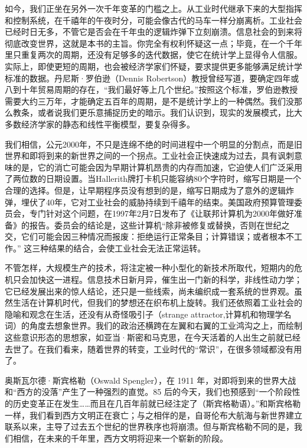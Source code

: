 如今，我们正坐在另外一次千年变革的门槛之上。从工业时代继承下来的大型指挥和控制系统，在千禧年的午夜时分，可能会像古代的马车一样分崩离析。工业社会已经时日无多，不管它是否会在千年虫的逻辑炸弹下立刻崩溃。信息社会的到来将彻底改变世界，这就是本书的主旨。你完全有权利怀疑这一点；毕竟，在一个千年里只重复两次的周期，还没有足够多的迭代数据，使它在统计学上显得令人信服。实际上，即使更短的周期，也会被经济学家们怀疑，要求提供更多能够满足统计学标准的数据。丹尼斯·罗伯逊（Dennis Robertson）教授曾经写道，要确定四年或八到十年贸易周期的存在，“我们最好等上几个世纪。”按照这个标准，罗伯逊教授需要大约三万年，才能确定五百年的周期，是不是统计学上的一种偶然。我们没那么教条，或者说我们更乐意捕捉历史的暗示。我们认识到，现实的发展模式，比大多数经济学家的静态和线性平衡模型，要复杂得多。


我们相信，公元2000年，不只是连绵不绝的时间进程中一个明显的分割点，而是旧世界和即将到来的新世界之间的一个拐点。工业社会正快速成为过去，具有讽刺意味的是，它的消亡可能会因为早期计算机昂贵的内存而加速，它迫使人们广泛采用了两位数的日期设置。当Hallerith牌打卡机只能容纳80个字符时，缩写日期是一个合理的选择。但是，让早期程序员没有想到的是，缩写日期成为了意外的逻辑炸弹，埋伏了40年，它对工业社会的威胁持续到千禧年的结束。美国政府预算管理委员会，专门针对这个问题，在1997年2月7日发布了《让联邦计算机为2000年做好准备》的报告。委员会的结论是，这些计算机“除非被修复或替换，否则在世纪之交，它们可能会因三种情况而报废：拒绝运行正常条目；计算错误；或者根本不工作。” 这三种结果的结合，会使工业社会无法正常运转。


不管怎样，大规模生产的技术，将注定被一种小型化的新技术所取代，短期内的危机只会加快这一进程。信息技术日新月异，催生出一门新的科学，非线性动力学；它已经发展出来的惊人结论，还只是一些线索，尚未编织成一套系统的世界观。虽然生活在计算机时代，但我们的梦想还在织布机上旋转。我们还依照着工业社会的隐喻和观念在生活，还没有从奇怪吸引子（strange attractor,计算机和物理学名词）的角度去想象世界。我们的政治还横跨在左翼和右翼的工业鸿沟之上，而绘制这些意识形态的思想家，如亚当·斯密和马克思，在今天活着的人出生之前就已经去世了。在我们看来，随着世界的转变，工业时代的“常识”，在很多领域都没有用了。


奥斯瓦尔德·斯宾格勒（Oswald Spengler），在 1911 年，对即将到来的世界大战和“西方的没落”产生了一种强烈的直觉。85 后的今天，我们也预感到“一个阶段性的历史变革正在发生……而且在几百年前就已经注定了（斯宾格勒语）。”和斯宾格勒一样，我们看到西方文明正在衰亡；与之相伴的是，自哥伦布大航海与新世界建立联系以来，主导了过去五个世纪的世界秩序也将崩溃。但与斯宾格勒不同的是，我们相信，在未来的千年里，西方文明将迎来一个崭新的阶段。
